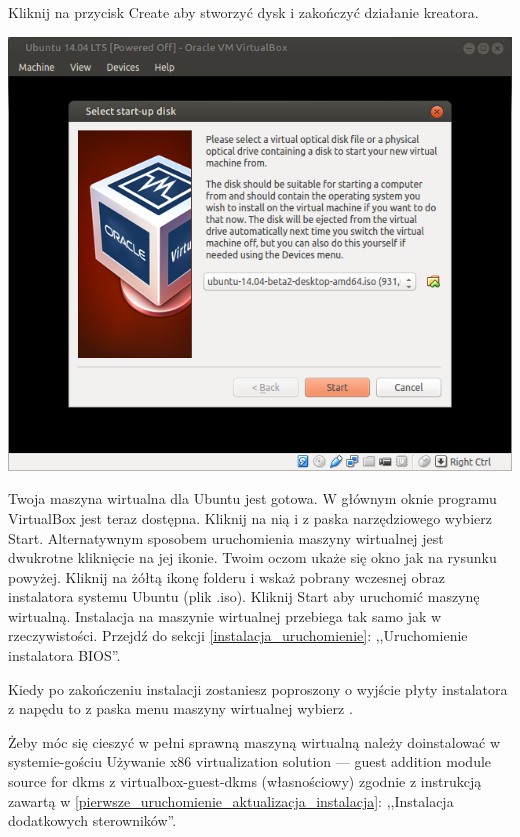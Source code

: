Kliknij na przycisk \textcolor{ubuntu_orange}{Create} aby stworzyć dysk i zakończyć działanie kreatora.
\clearpage
\begin{center}
	\includegraphics[width=\linewidth]{images/virtualbox_start.png}
\end{center}

Twoja maszyna wirtualna dla Ubuntu jest gotowa. W głównym oknie programu VirtualBox jest teraz dostępna. Kliknij na nią i z paska narzędziowego wybierz \textcolor{ubuntu_orange}{Start}. Alternatywnym sposobem uruchomienia maszyny wirtualnej jest dwukrotne kliknięcie na jej ikonie. Twoim oczom ukaże się okno jak na rysunku powyżej. Kliknij na żółtą ikonę folderu i wskaż pobrany wczesnej obraz instalatora systemu Ubuntu (plik .iso). Kliknij \textcolor{ubuntu_orange}{Start} aby uruchomić maszynę wirtualną. Instalacja na maszynie wirtualnej przebiega tak samo jak w rzeczywistości. Przejdź do sekcji \ref{instalacja_uruchomienie}: ,,Uruchomienie instalatora BIOS''.

Kiedy po zakończeniu instalacji zostaniesz poproszony o wyjście płyty instalatora z napędu to z paska menu maszyny wirtualnej wybierz .

Żeby móc się cieszyć w pełni sprawną maszyną wirtualną należy doinstalować w systemie-gościu \textcolor{ubuntu_orange}{Używanie x86 virtualization solution --- guest addition module source for dkms z virtualbox-guest-dkms (własnościowy)} zgodnie z instrukcją zawartą w \ref{pierwsze_uruchomienie_aktualizacja_instalacja}: ,,Instalacja dodatkowych sterowników''.
\clearpage
